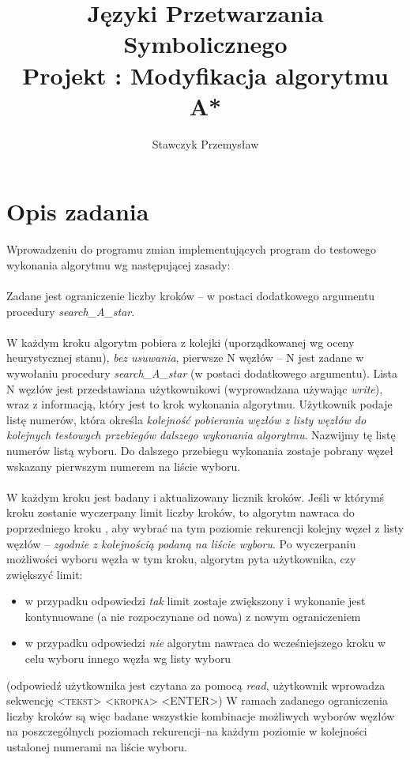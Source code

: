 \documentclass[11pt]{article} %
\title{%
	Języki Przetwarzania Symbolicznego \\
	\large Projekt : Modyfikacja algorytmu A*
	}
\author{Stawczyk Przemysław}
\date{} %
\begin{document}
\maketitle



\section{Opis zadania}

Wprowadzeniu do programu zmian implementujących program do testowego wykonania algorytmu wg
następującej zasady:
\\\\
Zadane jest ograniczenie liczby kroków -- w postaci dodatkowego argumentu procedury
\textit{search\_A\_star}.
\\\\
W każdym kroku algorytm pobiera z kolejki (uporządkowanej wg oceny heurystycznej stanu), \textit{bez
usuwania}, pierwsze N węzłów -- N jest zadane w wywołaniu procedury \textit{search\_A\_star} (w postaci
dodatkowego argumentu). Lista N węzłów jest przedstawiana użytkownikowi (wyprowadzana
używając \textit{write}), wraz z informacją, który jest to krok wykonania algorytmu. Użytkownik podaje listę
numerów, która określa \textit{kolejność pobierania węzłów z listy węzłów do kolejnych testowych
przebiegów dalszego wykonania algorytmu}. Nazwijmy tę listę numerów listą wyboru. Do dalszego
przebiegu wykonania zostaje pobrany węzeł wskazany pierwszym numerem na liście wyboru.
\\\\
W każdym kroku jest badany i aktualizowany licznik kroków. Jeśli w którymś kroku zostanie
wyczerpany limit liczby kroków, to algorytm nawraca do poprzedniego kroku , aby wybrać na tym
poziomie rekurencji kolejny węzeł z listy węzłów -- \textit{zgodnie z kolejnością podaną na liście wyboru}.
Po wyczerpaniu możliwości wyboru węzła w tym kroku, algorytm pyta użytkownika, czy zwiększyć
limit:
\begin{itemize}
	\item w przypadku odpowiedzi \textit{tak} limit zostaje zwiększony i wykonanie jest kontynuowane (a nie
	rozpoczynane od nowa) z nowym ograniczeniem
	\item w przypadku odpowiedzi \textit{nie} algorytm nawraca do wcześniejszego kroku w celu wyboru innego
	węzła wg listy wyboru
\end{itemize}
(odpowiedź użytkownika jest czytana za pomocą \textit{read},
użytkownik wprowadza sekwencję \textsc{<tekst> <kropka> <ENTER>})
W ramach zadanego ograniczenia liczby kroków są więc badane wszystkie kombinacje możliwych
wyborów węzłów na poszczególnych poziomach rekurencji--na każdym poziomie w kolejności
ustalonej numerami na liście wyboru.
\end{document}
